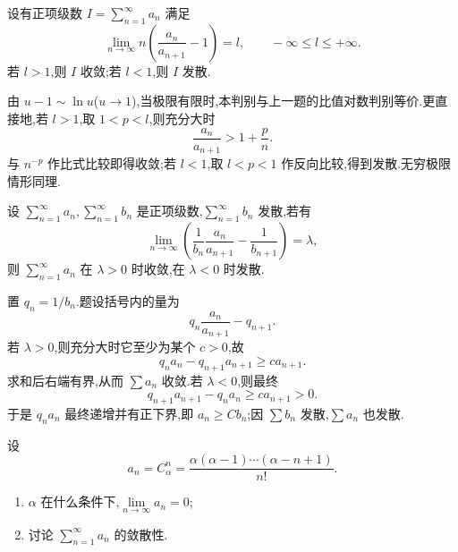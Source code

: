 \begin{example}
    设有正项级数 $\displaystyle I=\sum\limits_{n=1}^{\infty}a_n$ 满足
    \[
        \displaystyle\lim\limits_{n\to\infty}n\left(\dfrac{a_n}{a_{n+1}}-1\right)=l,
        \qquad -\infty\leq l\leq+\infty.
    \]
    若 $l>1$,则 $I$ 收敛;若 $l<1$,则 $I$ 发散.
\end{example}
\exampleblank

\begin{solution}
    由 $u-1\sim\ln u$($u\to1$),当极限有限时,本判别与上一题的比值对数判别等价.更直接地,若 $l>1$,取 $1<p<l$,则充分大时
    \[
        \dfrac{a_n}{a_{n+1}}>1+\dfrac{p}{n}.
    \]
    与 $n^{-p}$ 作比式比较即得收敛;若 $l<1$,取 $l<p<1$ 作反向比较,得到发散.无穷极限情形同理.
\end{solution}

\begin{example}
    设 $\displaystyle\sum\limits_{n=1}^{\infty}a_n,\sum\limits_{n=1}^{\infty}b_n$ 是正项级数,$\displaystyle\sum\limits_{n=1}^{\infty}b_n$ 发散,若有
    \[
        \displaystyle\lim\limits_{n\to\infty}\left(\dfrac{1}{b_n}\dfrac{a_n}{a_{n+1}}-\dfrac{1}{b_{n+1}}\right)=\lambda,
    \]
    则 $\displaystyle\sum\limits_{n=1}^{\infty}a_n$ 在 $\lambda>0$ 时收敛,在 $\lambda<0$ 时发散.
\end{example}
\exampleblank

\begin{solution}
    置 $q_n=1/b_n$.题设括号内的量为
    \[
        q_n\dfrac{a_n}{a_{n+1}}-q_{n+1}.
    \]
    若 $\lambda>0$,则充分大时它至少为某个 $c>0$,故
    \[
        q_na_n-q_{n+1}a_{n+1}\geq ca_{n+1}.
    \]
    求和后右端有界,从而 $\displaystyle \sum a_n$ 收敛.若 $\lambda<0$,则最终
    \[
        q_{n+1}a_{n+1}-q_na_n\geq ca_{n+1}>0.
    \]
    于是 $q_na_n$ 最终递增并有正下界,即 $a_n\geq Cb_n$;因
    $\displaystyle \sum b_n$ 发散,$\displaystyle \sum a_n$ 也发散.
\end{solution}

\begin{example}
    设
    \[
        a_n=C_{\alpha}^{n}=\dfrac{\alpha(\alpha-1)\cdots(\alpha-n+1)}{n!}.
    \]
    \begin{enumerate}
        \item $\alpha$ 在什么条件下,$\displaystyle\lim\limits_{n\to\infty}a_n=0$;
        \item 讨论 $\displaystyle\sum\limits_{n=1}^{\infty}a_n$ 的敛散性.
    \end{enumerate}
\end{example}
\exampleblank

